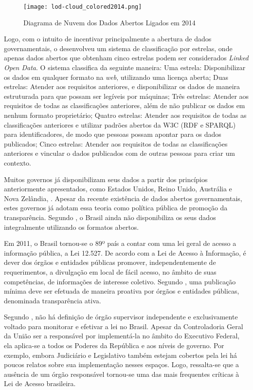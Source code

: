 \documentclass[
	12pt,				%
	openright,			%
	twoside,			%
	a4paper,			%
	english,			%
	french,				%
	spanish,			%
	brazil				%
	]{abntex2}
\begin{document}
\begin{figure}[htb]
	\caption{\label{grafo_lod}Diagrama de Nuvem dos Dados Abertos Ligados em 2014}
	\begin{center}
	    \texttt{[image: lod-cloud\_colored2014.png]}
	\end{center}
\end{figure}

Logo, com o intuito de incentivar principalmente a abertura de dados governamentais, o  
desenvolveu um sistema de classificação por estrelas, onde apenas dados abertos que obtenham cinco estrelas podem ser 
considerados \emph{Linked Open Data}. O sistema classifica da seguinte maneira:
Uma estrela: Disponibilizar os dados em qualquer formato na \emph{web}, utilizando uma licença aberta;
Duas estrelas: Atender aos requisitos anteriores, e disponibilizar os dados de maneira estruturada para que possam ser legíveis 
por máquinas;
Três estrelas: Atender aos requisitos de todas as classificações anteriores, além de não publicar os dados em nenhum formato 
proprietário;
Quatro estrelas: Atender aos requisitos de todas as classificações anteriores e utilizar padrões abertos da W3C (RDF e SPARQL)
para identificadores, de modo que pessoas possam apontar para os dados publicados;
Cinco estrelas: Atender aos requisitos de todas as classificações anteriores e vincular o dados publicados com de outras 
pessoas para criar um contexto.

Muitos governos já disponibilizam seus dados a partir dos princípios anteriormente apresentados, como Estados Unidos,
Reino Unido, Austrália e Nova Zelândia, . Apesar da recente existência de dados abertos governamentais,
estes governos já adotam essa teoria como política pública de promoção da transparência. Segundo , o Brasil ainda não disponibiliza os
seus dados integralmente utilizando os formatos abertos.

Em 2011, o Brasil tornou-se o 89º país a contar com uma lei geral de acesso a informação pública, a Lei 12.527. De acordo com 
a Lei de Acesso à Informação, é dever dos órgãos e entidades públicas promover, independentemente de requerimentos, a divulgação
em local de fácil acesso, no âmbito de suas competências, de informações de interesse coletivo. Segundo , uma publicação mínima deve ser
efetuada de maneira proativa por órgãos e entidades públicas, denominada transparência ativa.

Segundo , não há definição de órgão supervisor independente e exclusivamente voltado para monitorar
e efetivar a lei no Brasil. Apesar da Controladoria Geral da União ser a responsável por implementá-la no âmbito do Executivo
Federal, ela aplica-se a todos os Poderes da República e aos níveis de governo. Por exemplo, embora Judiciário e Legislativo
também estejam cobertos pela lei há poucos relatos sobre sua implementação nesses espaços. Logo, ressalta-se que a ausência de
um órgão responsável tornou-se uma das mais frequentes críticas à Lei de Acesso brasileira.
\end{document}
